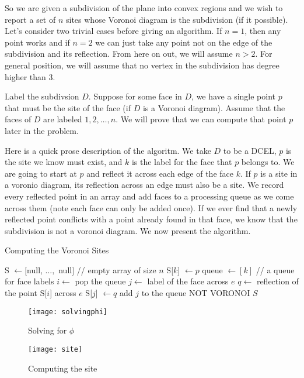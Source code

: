 \documentclass[11pt]{article}
\begin{document}
\answer
So we are given a subdivision of the plane into convex regions and we wish to report a set of $n$ sites whose Voronoi diagram is the subdivision (if it possible).
Let's consider two trivial cases before giving an algorithm.
If $n=1$, then any point works and if $n=2$ we can just take any point not on the edge of the subdivision and its reflection.
From here on out, we will assume $n > 2$.
For general position, we will assume that no vertex in the subdivision has degree higher than 3.

Label the subdivsion $D$.
Suppose for some face in $D$, we have a single point $p$ that must be the site of the face (if $D$ is a Voronoi diagram).
Assume that the faces of $D$ are labeled $1, 2, \ldots, n$.
We will prove that we can compute that point $p$ later in the problem.

Here is a quick prose description of the algoritm.
We take $D$ to be a DCEL, $p$ is the site we know must exist, and $k$ is the label for the face that $p$ belongs to.
We are going to start at $p$ and reflect it across each edge of the face $k$.
If $p$ is a site in a voronio diagram, its reflection across an edge must also be a site.
We record every reflected point in an array and add faces to a processing queue as we come across them (note each face can only be added once).
If we ever find that a newly reflected point conflicts with a point already found in that face, we know that the subdivision is not a voronoi diagram.
We now present the algorithm.

\begin{algorithm}
\caption{Computing the Voronoi Sites}
\label{alg:voronoisites}
    \begin{algorithmic}[1]
        \State S $\gets [$null, $\ldots, $ null$]$ // empty array of size $n$
        \State S[$k$] $\gets p$
        \State queue $\gets [ k ]$  // a queue for face labels
            \State $i \gets$ pop the queue
                \State $j \gets $ label of the face across $e$
                \State $q \gets $ reflection of the point S[$i$] across $e$
                    \State S[$j$] $\gets q$
                    \State add $j$ to the queue
                    \State \Return NOT VORONOI
                \EndIf
            \EndFor
        \EndWhile
        \State \Return $S$
    \EndFunction
    \end{algorithmic}
\end{algorithm}

\begin{figure}[h]
    \centering
    \texttt{[image: solvingphi]}
    \label{fig:solvingphi}
    \caption{Solving for $\phi$}
\end{figure}

\begin{figure}[h]
    \centering
    \texttt{[image: site]}
    \label{fig:site}
    \caption{Computing the site}
\end{figure}
\end{document}
